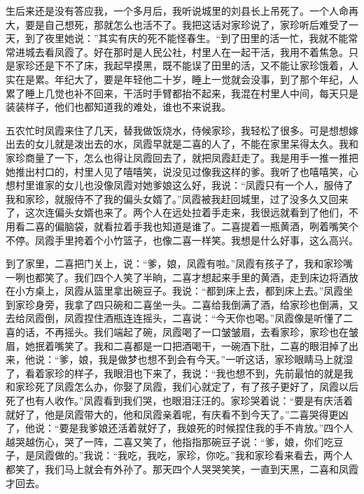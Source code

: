 \documentclass[12pt,UTF8]{ctexbook}
\begin{document}
生后来还是没有答应我，一个多月后，我听说城里的刘县长上吊死了。一个人命再大，要是自己想死，那就怎么也活不了。我把这话对家珍说了，家珍听后难受了一天，到了夜里她说：”其实有庆的死不能怪春生。“到了田里的活一忙，我就不能常常进城去看凤霞了。好在那时是人民公社，村里人在一起干活，我用不着焦急。只是家珍还是下不了床，我起早摸黑，既不能误了田里的活，又不能让家珍饿着，人实在是累。年纪大了，要是年轻他二十岁，睡上一觉就会没事，到了那个年纪，人累了睡上几觉也补不回来，干活时手臂都抬不起来，我混在村里人中间，每天只是装装样子，他们也都知道我的难处，谁也不来说我。

五农忙时凤霞来住了几天，替我做饭烧水，侍候家珍，我轻松了很多。可是想想嫁出去的女儿就是泼出去的水，凤霞早就是二喜的人了，不能在家里呆得太久。我和家珍商量了一下，怎么也得让凤霞回去了，就把凤霞赶走了。我是用手一推一推把她推出村口的，村里人见了嘻嘻笑，说没见过像我这样的爹。我听了也嘻嘻笑，心想村里谁家的女儿也没像凤霞对她爹娘这么好，我说：“凤霞只有一个人，服侍了我和家珍，就服侍不了我的偏头女婿了。”凤霞被我赶回城里，过了没多久又回来了，这次连偏头女婿也来了。两个人在远处拉着手走来，我很远就看到了他们，不用看二喜的偏脑袋，就看拉着手我也知道是谁了。二喜提着一瓶黄酒，咧着嘴笑个不停。凤霞手里挎着个小竹篮子，也像二喜一样笑。我想是什么好事，这么高兴。

到了家里，二喜把门关上，说：“爹，娘，凤霞有啦。”凤霞有孩子了，我和家珍嘴一咧也都笑了。我们四个人笑了半晌，二喜才想起来手里的黄酒，走到床边将酒放在小方桌上，凤霞从篮里拿出碗豆子。我说：“都到床上去，都到床上去。”凤霞坐到家珍身旁，我拿了四只碗和二喜坐一头。二喜给我倒满了酒，给家珍也倒满，又去给凤霞倒，凤霞捏住酒瓶连连摇头，二喜说：“今天你也喝。”凤霞像是听懂了二喜的话，不再摇头。我们端起了碗，凤霞喝了一口皱皱眉，去看家珍，家珍也在皱眉，她抿着嘴笑了。我和二喜都是一口把酒喝干，一碗酒下肚，二喜的眼泪掉了出来，他说：“爹，娘，我是做梦也想不到会有今天。”一听这话，家珍眼睛马上就湿了，看着家珍的样子，我眼泪也下来了，我说：“我也想不到，先前最怕的就是我和家珍死了凤霞怎么办，你娶了凤霞，我们心就定了，有了孩子更好了，凤霞以后死了也有人收作。”凤霞看到我们哭，也眼泪汪汪的。家珍哭着说：“要是有庆活着就好了，他是凤霞带大的，他和凤霞亲着呢，有庆看不到今天了。”二喜哭得更凶了，他说：“要是我爹娘还活着就好了，我娘死的时候捏住我的手不肯放。”四个人越哭越伤心，哭了一阵，二喜又笑了，他指指那碗豆子说：“爹，娘，你们吃豆子，是凤霞做的。”我说：“我吃，我吃，家珍，你吃。”我和家珍看来看去，两个人都笑了，我们马上就会有外孙了。那天四个人哭哭笑笑，一直到天黑，二喜和凤霞才回去。
\end{document}
